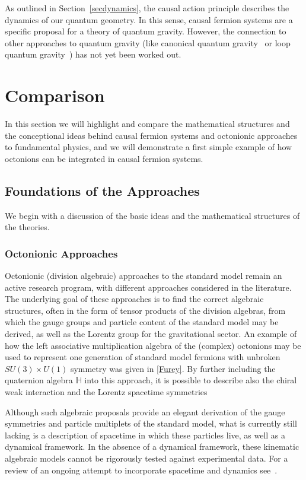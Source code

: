 \documentclass[reqno,11pt]{amsart}
\numberwithin{equation}{section}
\newcommand{\1}{\mbox{\rm 1 \hspace{-1.05 em} 1}}
\newcommand{\bb}[1]{\mathbb{#1}}
\begin{document}
As outlined in Section~\ref{secdynamics}, the causal action principle describes the dynamics of our
quantum geometry. In this sense, causal fermion systems are a specific proposal for a theory of quantum gravity.
However, the connection to other approaches to quantum gravity (like canonical quantum gravity~\cite{kiefernew}
or loop quantum gravity~\cite{thiemann}) has not yet been worked out.

\section{Comparison} \label{sec:comparison} 
In this section we will highlight and compare the mathematical structures and the conceptional ideas behind
causal fermion systems and octonionic approaches to fundamental physics, and we will demonstrate a first simple example of how octonions can be integrated in causal fermion systems.
\subsection{Foundations of the Approaches}\label{sec:foundations}
We begin with a discussion of the basic ideas and the mathematical structures of the theories.

\subsubsection{Octonionic Approaches} 

Octonionic (division algebraic) approaches to the standard model remain an active research program, with different approaches considered in the literature. The underlying goal of these approaches is to find the correct algebraic structures, often in the form of tensor products of the division algebras, from which the gauge groups and particle content of the standard model may be derived, as well as the Lorentz group for the gravitational sector. An example of how the left associative multiplication algebra of the (complex) octonions may be used to represent one generation of standard model fermions with unbroken $SU(3)\times U(1)$ symmetry was given in \ref{Furey}. By further including the quaternion algebra $\bb{H}$ into this approach, it is possible to describe also the chiral weak interaction and the Lorentz spacetime symmetries \cite{dixon1990derivation,dixon2013division,furey2018demonstration,furey231}

Although such algebraic proposals provide an elegant derivation of the gauge symmetries and particle multiplets of the standard model, what is currently still lacking is a description of spacetime in which these particles live, as well as a dynamical framework. In the absence of a dynamical framework, these kinematic algebraic models cannot be rigorously tested against experimental data. For a review of an ongoing attempt to incorporate spacetime and dynamics see~\cite{singh-octo4}.
\end{document}
